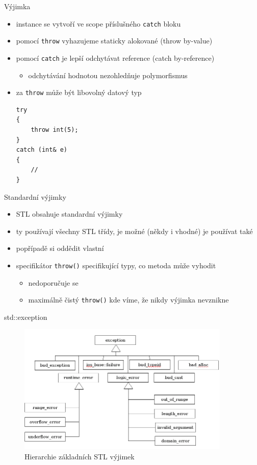 \documentclass{beamer}
\begin{document}
\begin{xframe}{Výjimka}
	\begin{itemize}
		\item instance se vytvoří ve scope příslušného \texttt{catch} bloku
		\item pomocí \texttt{throw} vyhazujeme staticky alokované (throw by-value)
		\item pomocí \texttt{catch} je lepší odchytávat reference (catch by-reference)
			\begin{itemize}
				\item odchytávání hodnotou nezohledňuje polymorfismus
			\end{itemize}
		\item za \texttt{throw} může být libovolný datový typ
\begin{lstlisting}[basicstyle=\fontsize{8}{9}\selectfont\ttfamily]
try
{
    throw int(5);
}
catch (int& e)
{
    //
}
\end{lstlisting}
	\end{itemize}
\end{xframe}


\begin{xframe}{Standardní výjimky}
	\begin{itemize}
		\item STL obsahuje standardní výjimky
		\item ty používají všechny STL třídy, je možné (někdy i vhodné) je používat také
		\item popřípadě si oddědit vlastní
		\item specifikátor \texttt{throw()} specifikující typy, co metoda může vyhodit
			\begin{itemize}
				\item nedoporučuje se
				\item maximálně čistý \texttt{throw()} kde víme, že nikdy výjimka nevznikne
			\end{itemize}
	\end{itemize}
\end{xframe}

\begin{xframe}{std::exception}
	\begin{figure}[ht]
		\centering
		\includegraphics[width=0.9\textwidth]{std_exceptions.png}
		\caption{Hierarchie základních STL výjimek}
	\end{figure}
\end{xframe}
\end{document}
